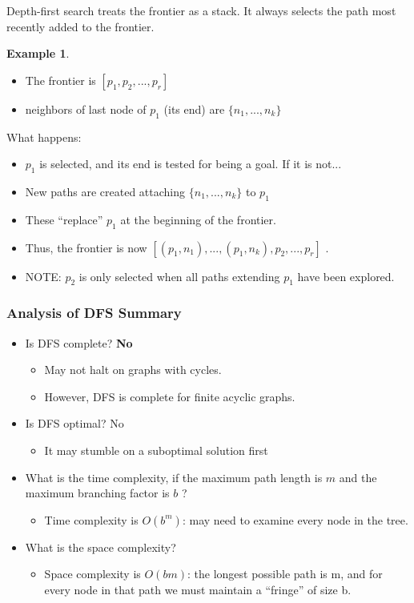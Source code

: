 \documentclass{article}
\theoremstyle{definition}
\theoremstyle{example}
\newtheorem{example}{Example}
\begin{document}
Depth-first search treats the frontier as a stack. It always selects the path most recently added to the frontier.

\begin{example} 
	\begin{itemize}
		\item The frontier is $ [p_1, p_2, ..., p_r] $
		\item neighbors of last node of $ p_1 $ (its end) are $ \{n_1, ..., n_k\} $
	\end{itemize}
What happens:
\begin{itemize}
	\item $ p_1 $ is selected, and its end is tested for being a goal. If it is not...
	\item New paths are created attaching $ \{n_1, ..., n_k\} $ to $ p_1 $
	\item These “replace” $ p_1 $ at the beginning of the frontier.
	\item Thus, the frontier is now $ [(p_1, n_1), ..., (p_1, n_k), p_2, ..., p_r] $ .
	\item NOTE: $ p_2 $ is only selected when all paths extending $ p_1 $ have been explored.
\end{itemize}
\end{example}
\subsubsection*{Analysis of DFS Summary}
\begin{itemize}
	\item Is DFS complete? {\bf No}
	\begin{itemize}
		\item May not halt on graphs with cycles.
		\item However, DFS is complete for finite acyclic graphs.
	\end{itemize}
\item Is DFS optimal? No
\begin{itemize}
	\item It may stumble on a suboptimal solution first
\end{itemize}
\item What is the time complexity, if the maximum path length is $ m $ and the maximum branching factor is $ b $ ?
\begin{itemize}
	\item Time complexity is $ O(b^m) $: may need to examine every node in the tree.
\end{itemize}
\item What is the space complexity?
\begin{itemize}
	\item Space complexity is $ O(bm) $: the longest possible path is m, and for every node in that path we must maintain a “fringe” of size b.
\end{itemize}
\end{itemize}
\end{document}
